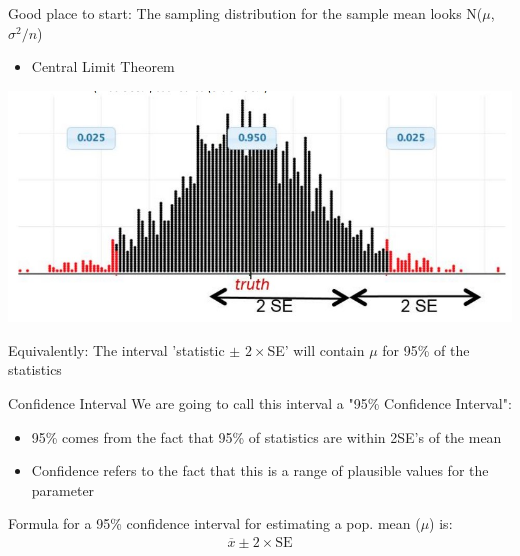 \documentclass{beamer}
\begin{document}
\begin{frame}{Good place to start:}
The sampling distribution for the sample mean looks N($\mu$, $\sigma^2 / n$)
\begin{itemize}
    \item Central Limit Theorem
\end{itemize}
\begin{center}
    \includegraphics[scale=.57]{img/sampling_dist_CI2.jpg}
\end{center}
Equivalently: The interval 'statistic $\pm$ 
$2\times$SE' will contain $\mu$ for 95\% of the statistics
\end{frame}

\begin{frame}{Confidence Interval}
We are going to call this interval a "95\% Confidence Interval":
\begin{itemize}
    \item 95\% comes from the fact that 95\% of statistics are within 2SE's of the mean
    \item Confidence refers to the fact that this is a range of plausible values for the parameter
\end{itemize} \vspace{10mm}

Formula for a 95\% confidence interval for estimating a pop. mean ($\mu$) is:
\begin{align*}
\overline{x} \pm 2 \times \text{SE}
\end{align*}
\end{frame}
\end{document}
